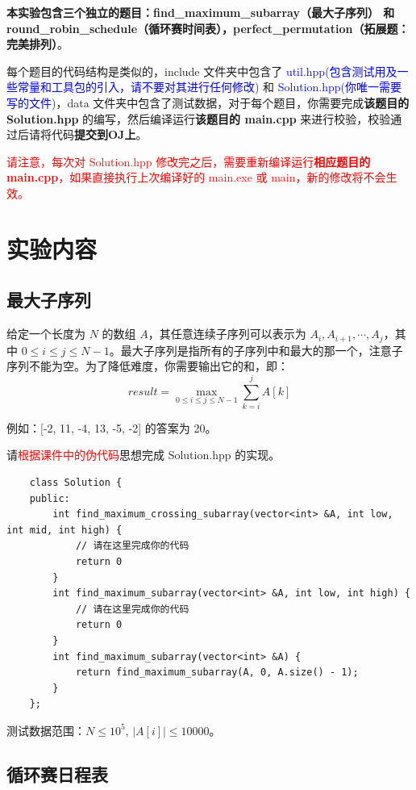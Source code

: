 \documentclass[12pt,a4paper]{article}
\begin{document}
\textbf{本实验包含三个独立的题目：find\_maximum\_subarray（最大子序列） 和 round\_robin\_schedule（循环赛时间表），perfect\_permutation（拓展题：完美排列）}。

每个题目的代码结构是类似的，include 文件夹中包含了 \textcolor{blue}{util.hpp(包含测试用及一些常量和工具包的引入，请不要对其进行任何修改)} 和 \textcolor{blue}{Solution.hpp(你唯一需要写的文件)}，data 文件夹中包含了测试数据，对于每个题目，你需要完成\textbf{该题目的 Solution.hpp }的编写，然后编译运行\textbf{该题目的 main.cpp }来进行校验，校验通过后请将代码\textbf{提交到OJ上}。

\textcolor{red}{请注意，每次对 Solution.hpp 修改完之后，需要重新编译运行\textbf{相应题目的 main.cpp}，如果直接执行上次编译好的 main.exe 或 main，新的修改将不会生效。}




\section{实验内容}

\subsection{最大子序列}

给定一个长度为 $N$ 的数组 $A$，其任意连续子序列可以表示为 $A_i, A_{i+1}, \cdots, A_{j}$，其中 $0\le i \le j \le N-1$。最大子序列是指所有的子序列中和最大的那一个，注意子序列不能为空。为了降低难度，你需要输出它的和，即：
$$result = \max_{0\le i\le j \le N-1}{\sum_{k=i}^j A[k]}$$

例如：[-2, 11, -4, 13, -5, -2] 的答案为 20。

请\textcolor{red}{根据课件中的伪代码}思想完成 Solution.hpp 的实现。

\begin{lstlisting}
    class Solution {
    public:
        int find_maximum_crossing_subarray(vector<int> &A, int low, int mid, int high) {
            // 请在这里完成你的代码
            return 0
        }
        int find_maximum_subarray(vector<int> &A, int low, int high) {
            // 请在这里完成你的代码
            return 0
        }
        int find_maximum_subarray(vector<int> &A) {
            return find_maximum_subarray(A, 0, A.size() - 1);
        }
    };
\end{lstlisting}

测试数据范围：$N\le 10^5$, $|A[i]| \le 10000$。



\subsection{循环赛日程表}
\end{document}
